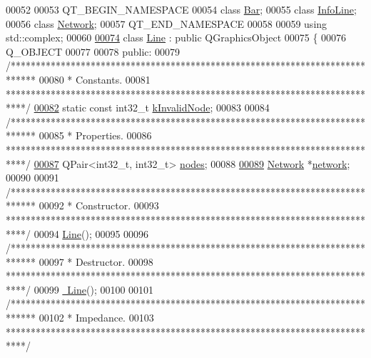 \begin{DoxyCode}
00052 
00053 QT\_BEGIN\_NAMESPACE
00054 \textcolor{keyword}{class }\hyperlink{class_bar}{Bar};
00055 \textcolor{keyword}{class }\hyperlink{class_info_line}{InfoLine};
00056 \textcolor{keyword}{class }\hyperlink{class_network}{Network};
00057 QT\_END\_NAMESPACE
00058 
00059 \textcolor{keyword}{using} std::complex;
00060 
\hypertarget{line_8h_source_l00074}{}\hyperlink{class_line}{00074} \textcolor{keyword}{class }\hyperlink{class_line}{Line} : \textcolor{keyword}{public} QGraphicsObject
00075 \{
00076   Q\_OBJECT
00077 
00078 \textcolor{keyword}{public}:
00079   \textcolor{comment}{/*****************************************************************************}
00080 \textcolor{comment}{   * Constants.}
00081 \textcolor{comment}{   ****************************************************************************/}
\hypertarget{line_8h_source_l00082}{}\hyperlink{group___models_gadc334bd07c6126abc56e531d7e3e72b4}{00082}   \textcolor{keyword}{static} \textcolor{keyword}{const} int32\_t \hyperlink{group___models_gadc334bd07c6126abc56e531d7e3e72b4}{kInvalidNode};
00083 
00084   \textcolor{comment}{/*****************************************************************************}
00085 \textcolor{comment}{   * Properties.}
00086 \textcolor{comment}{   ****************************************************************************/}
\hypertarget{line_8h_source_l00087}{}\hyperlink{class_line_afd17c40d656e6a8d677cb22df5f0c70b}{00087}   QPair<int32\_t, int32\_t> \hyperlink{class_line_afd17c40d656e6a8d677cb22df5f0c70b}{nodes};
00088 
\hypertarget{line_8h_source_l00089}{}\hyperlink{class_line_aefdf6a6c3e3775b5a16b344c1d33964e}{00089}   \hyperlink{class_network}{Network} *\hyperlink{class_line_aefdf6a6c3e3775b5a16b344c1d33964e}{network};
00090 
00091   \textcolor{comment}{/*****************************************************************************}
00092 \textcolor{comment}{   * Constructor.}
00093 \textcolor{comment}{   ****************************************************************************/}
00094   \hyperlink{group___models_gacc11b8a429d8cdd63ba6803dff5602b3}{Line}();
00095 
00096   \textcolor{comment}{/*****************************************************************************}
00097 \textcolor{comment}{   * Destructor.}
00098 \textcolor{comment}{   ****************************************************************************/}
00099   \hyperlink{group___models_gaabe85f48d22d92b62257091f48174fac}{~Line}();
00100 
00101   \textcolor{comment}{/*****************************************************************************}
00102 \textcolor{comment}{   * Impedance.}
00103 \textcolor{comment}{   ****************************************************************************/}

\end{DoxyCode}
